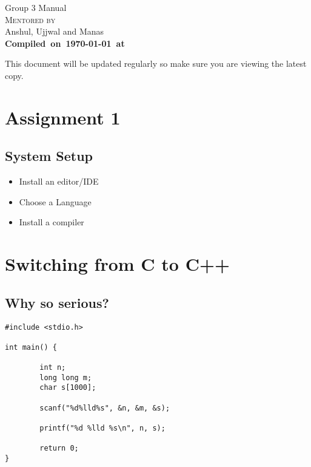 \documentclass[13pt,oneside,a4paper]{book}
\begin{document}
\begin{titlepage}
\begin{center}
        \pagebreak

        \hspace{0pt}
        \vfill
        {\fontsize{32pt}{10pt}\selectfont Group 3 Manual}\\
        \vspace{3cm}
        \textsc{\Large Mentored by} \\

        {\large Anshul, Ujjwal and Manas} \\
        \vspace{1cm}
        \textbf{Compiled~on~\today~at~\currenttime}

        \vspace*{\fill}
\end{center}

        {\fontsize{11pt}{10pt}\selectfont
               This document will be updated regularly so make sure you are viewing the latest copy. 
        }
\end{titlepage}

\tableofcontents
\clearpage
{}

\chapter{Assignment 1}
\section{System Setup}
\begin{itemize}
        \item Install an editor/IDE
        \item Choose a Language
        \item Install a compiler
\end{itemize}

\clearpage

\chapter{Switching from C to C++}
\section{Why so serious?}

\begin{verbatim}
#include <stdio.h>

int main() {

        int n;
        long long m;
        char s[1000];

        scanf("%d%lld%s", &n, &m, &s);

        printf("%d %lld %s\n", n, s);

        return 0;
}
\end{verbatim}
\end{document}
